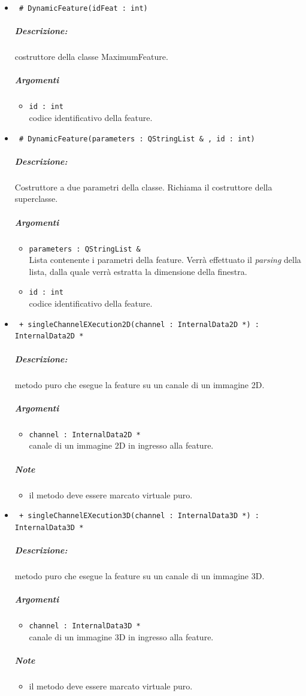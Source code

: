 	\begin{itemize}
	\item \color{blue}\verb! # DynamicFeature(idFeat : int)!
		\color{black}
		\subparagraph{Descrizione:} costruttore della classe MaximumFeature.
		\subparagraph{Argomenti}
			\begin{itemize}
				\item \color{RoyalPurple} \verb!id : int! \\ 
				\color{black} codice identificativo della feature\g{}.	
			\end{itemize}
			
	\item \color{blue}\verb! # DynamicFeature(parameters : QStringList & , id : int)!
		\color{black}
		\subparagraph{Descrizione:} Costruttore a due parametri della classe. Richiama il costruttore della 						superclasse.
		\subparagraph{Argomenti}
			\begin{itemize}	
				\item \color{RoyalPurple} \verb!parameters : QStringList &! \\ 
				\color{black} Lista contenente i parametri della feature\g{}. Verrà effettuato il \textit{parsing} 						della lista, dalla quale verrà estratta la dimensione della finestra.
				\item \color{RoyalPurple} \verb!id : int! \\ 
				\color{black} codice identificativo della feature\g{}.	
			\end{itemize}

	\item \color{blue}\verb! + singleChannelEXecution2D(channel : InternalData2D *) : InternalData2D *!
		\color{black}
		\subparagraph{Descrizione:} metodo puro che esegue la feature su un canale di un immagine 2D.
		\subparagraph{Argomenti}
			\begin{itemize}
				\item \color{RoyalPurple} \verb!channel : InternalData2D * ! \\ 
				\color{black} canale di un immagine 2D in ingresso alla feature.		
			\end{itemize}
		\subparagraph{Note}
			\begin{itemize}
				\item il metodo deve essere marcato virtuale puro.
			\end{itemize}
			
	\item \color{blue}\verb! + singleChannelEXecution3D(channel : InternalData3D *) : InternalData3D *!
		\color{black}
		\subparagraph{Descrizione:} metodo puro che esegue la feature su un canale di un immagine 3D.
		\subparagraph{Argomenti}
			\begin{itemize}
				\item \color{RoyalPurple} \verb!channel : InternalData3D * ! \\ 
				\color{black} canale di un immagine 3D in ingresso alla feature.		
			\end{itemize}
		\subparagraph{Note}
			\begin{itemize}
				\item il metodo deve essere marcato virtuale puro.
			\end{itemize}
			

\end{itemize}
